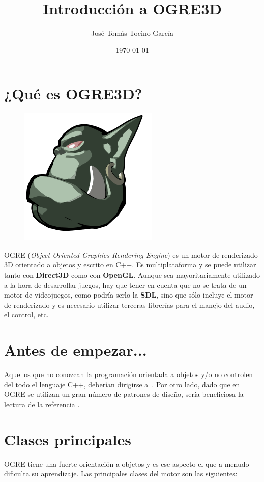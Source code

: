 \documentclass[a4paper]{scrartcl}
\title{Introducción a OGRE3D}
\author{José Tomás Tocino García}
\date{\today}
\begin{document}
\maketitle
\section*{¿Qué es OGRE3D?}

\begin{figure}
\vspace{-1cm}
  \includegraphics[scale=0.3]{caraOgro}
\vspace{-0.5cm}
\end{figure}

OGRE (\textit{Object-Oriented Graphics Rendering Engine}) es un motor de renderizado 3D orientado a objetos y escrito en C++.
Es multiplataforma y se puede utilizar tanto con \textbf{Direct3D} como con \textbf{OpenGL}. Aunque sea mayoritariamente utilizado 
a la hora de desarrollar juegos, hay que tener en cuenta que no se trata de un motor de videojuegos, como podría serlo la \textbf{SDL},
sino que sólo incluye el motor de renderizado y es necesario utilizar terceras librerías para el manejo del audio, el control, etc.

\section*{Antes de empezar...}
Aquellos que no conozcan la programación orientada a objetos y/o no controlen del todo el lenguaje C++, deberían dirigirse a~\cite{DBLP:books/aw/Stroustrup91}.
Por otro lado, dado que en OGRE se utilizan un gran número de patrones de diseño, sería beneficiosa la lectura de la referencia \cite{GammaHJV93}.

\section*{Clases principales}
OGRE tiene una fuerte orientación a objetos y es ese aspecto el que a menudo dificulta su aprendizaje. Las principales clases
del motor son las siguientes:
\end{document}
